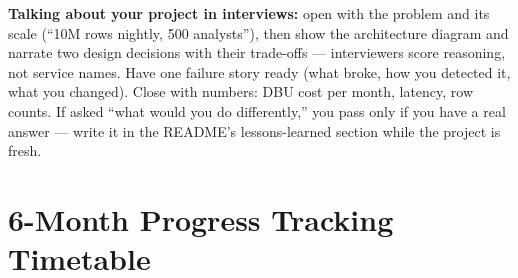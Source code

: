 \documentclass[11pt, a4paper]{article}
\begin{document}
\noindent\textbf{Talking about your project in interviews:} open with the problem and its scale (``10M rows nightly, 500 analysts''), then show the architecture diagram and narrate two design decisions with their trade-offs --- interviewers score reasoning, not service names. Have one failure story ready (what broke, how you detected it, what you changed). Close with numbers: DBU cost per month, latency, row counts. If asked ``what would you do differently,'' you pass only if you have a real answer --- write it in the README's lessons-learned section while the project is fresh.

\newpage
\section{6-Month Progress Tracking Timetable}
\end{document}

